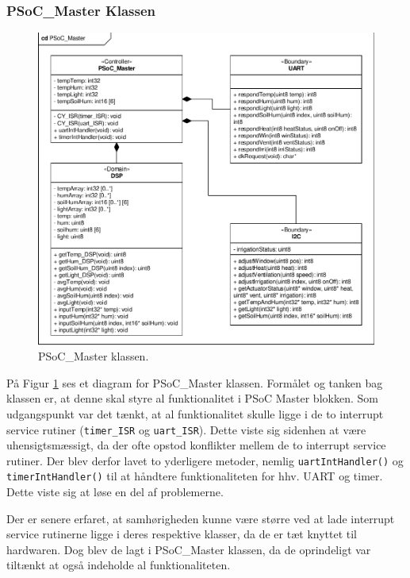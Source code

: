 \subsubsection{PSoC\_Master Klassen}
\begin{figure}[h]
\centering 
\includegraphics[width=\textwidth * 2/5, trim=15 282 269 31, clip=true] {../fig/cd_PSoC_master.pdf}
\caption{PSoC\_Master klassen.}
\label{fig:Master_PSoC_klasse}
\end{figure}

På Figur \ref{fig:Master_PSoC_klasse} ses et diagram for PSoC\_Master klassen.
Formålet og tanken bag klassen er, at denne skal styre al funktionalitet i PSoC Master blokken.
Som udgangspunkt var det tænkt, at al funktionalitet skulle ligge i de to interrupt service rutiner (\texttt{timer\_ISR} og \texttt{uart\_ISR}). 
Dette viste sig sidenhen at være uhensigtsmæssigt, da der ofte opstod konflikter mellem de to interrupt service rutiner.
Der blev derfor lavet to yderligere metoder, nemlig \texttt{uartIntHandler()} og \texttt{timerIntHandler()} til at håndtere funktionaliteten for hhv. UART og timer.
Dette viste sig at løse en del af problemerne.

Der er senere erfaret, at samhørigheden kunne være større ved at lade interrupt service rutinerne ligge i deres respektive klasser, da de er tæt knyttet til hardwaren.
Dog blev de lagt i PSoC\_Master klassen, da de oprindeligt var tiltænkt at også indeholde al funktionaliteten.